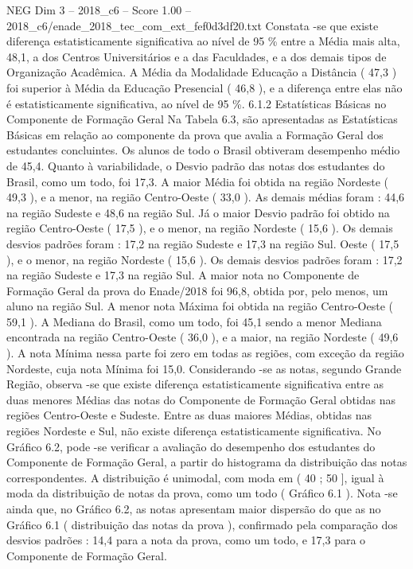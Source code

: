 \begin{textsample}{NEG Dim 3 – 2018\_c6 – Score 1.00 – 2018\_c6/enade\_2018\_tec\_com\_ext\_fef0d3df20.txt}
Constata -se que existe diferença estatisticamente significativa ao nível de 95 \% entre a Média mais alta, 48,1, a dos Centros Universitários e a das Faculdades, e a dos demais tipos de Organização Acadêmica.
A Média da Modalidade Educação a Distância ( 47,3 ) foi superior à Média da Educação Presencial ( 46,8 ), e a diferença entre elas não é estatisticamente significativa, ao nível de 95 \%. 6.1.2 Estatísticas Básicas no Componente de Formação Geral Na Tabela 6.3, são apresentadas as Estatísticas Básicas em relação ao componente da prova que avalia a Formação Geral dos estudantes concluintes.
Os alunos de todo o Brasil obtiveram desempenho médio de 45,4.
Quanto à variabilidade, o Desvio padrão das notas dos estudantes do Brasil, como um todo, foi 17,3.
A maior Média foi obtida na região Nordeste ( 49,3 ), e a menor, na região Centro-Oeste ( 33,0 ).
As demais médias foram : 44,6 na região Sudeste e 48,6 na região Sul.
Já o maior Desvio padrão foi obtido na região Centro-Oeste ( 17,5 ), e o menor, na região Nordeste ( 15,6 ).
Os demais desvios padrões foram : 17,2 na região Sudeste e 17,3 na região Sul.
Oeste ( 17,5 ), e o menor, na região Nordeste ( 15,6 ).
Os demais desvios padrões foram : 17,2 na região Sudeste e 17,3 na região Sul.
A maior nota no Componente de Formação Geral da prova do Enade/2018 foi 96,8, obtida por, pelo menos, um aluno na região Sul.
A menor nota Máxima foi obtida na região Centro-Oeste ( 59,1 ).
A Mediana do Brasil, como um todo, foi 45,1 sendo a menor Mediana encontrada na região Centro-Oeste ( 36,0 ), e a maior, na região Nordeste ( 49,6 ).
A nota Mínima nessa parte foi zero em todas as regiões, com exceção da região Nordeste, cuja nota Mínima foi 15,0.
Considerando -se as notas, segundo Grande Região, observa -se que existe diferença estatisticamente significativa entre as duas menores Médias das notas do Componente de Formação Geral obtidas nas regiões Centro-Oeste e Sudeste.
Entre as duas maiores Médias, obtidas nas regiões Nordeste e Sul, não existe diferença estatisticamente significativa.
No Gráfico 6.2, pode -se verificar a avaliação do desempenho dos estudantes do Componente de Formação Geral, a partir do histograma da distribuição das notas correspondentes.
A distribuição é unimodal, com moda em ( 40 ; 50 ], igual à moda da distribuição de notas da prova, como um todo ( Gráfico 6.1 ).
Nota -se ainda que, no Gráfico 6.2, as notas apresentam maior dispersão do que as no Gráfico 6.1 ( distribuição das notas da prova ), confirmado pela comparação dos desvios padrões : 14,4 para a nota da prova, como um todo, e 17,3 para o Componente de Formação Geral.

\end{textsample}
